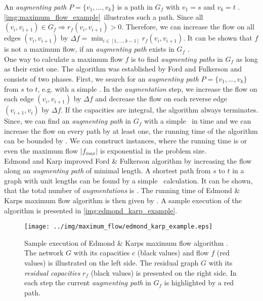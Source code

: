 An \emph{augmenting path} $P = \{v_1,\ldots,v_k\}$ is a path in $G_f$ with $v_1 = s$ and 
$v_k = t$ \cite{edmonds1972theoretical}. \autoref{img:maximum_flow_example}~illustrates such a path.
Since all $(v_i,v_{i+1}) \in G_f \Rightarrow r_f(v_i,v_{i+1}) > 0$. 
Therefore, we can increase the flow on all edges $(v_i,v_{i+1})$ by 
$\Delta f = \min_{i \in [1,\ldots,k-1]} r_f(v_i,v_{i+1})$. It can be shown that $f$ is not a
maximum flow, if an \emph{augmenting path} exists in $G_f$ \cite{edmonds1972theoretical}. \\
One way to calculate a maximum flow $f$ is to find \emph{augmenting paths} in $G_f$ as
long as their exist one. The algorithm was established by Ford and Fulkerson \cite{ford1956maximal} and
consists of two phases. First, we search for an \emph{augmenting path} $P = \{v_1,\ldots,v_k\}$
from $s$ to $t$, e.g. with a simple \DFS. In the \emph{augmentation} step, we increase the flow on each
edge $(v_i,v_{i+1})$ by $\Delta f$ and decrease the flow on each reverse edge $(v_{i+1},v_i)$
by $\Delta f$. If the capacities are integral, the algorithm always terminates. Since, we can find an \emph{augmenting
path} in $G_f$ with a simple \DFS~in time  and we can increase the
flow on every path by at least one, the running time of the algorithm can be bounded by .
We can construct instances, where the running time is  or even the maximum flow $|f_{max}|$ 
is exponential in the problem size. \\
Edmond and Karp \cite{edmonds1972theoretical} improved Ford \& Fulkerson algorithm by increasing the flow
along an \emph{augmenting path} of minimal length. A shortest path from $s$ to $t$ in a 
graph with unit lengths can be found by a simple \BFS~calculation. It can be shown, that the
total number of \emph{augmentations} is . The running time of Edmond \& Karps
maximum flow algorithm is then given by . A sample execution of the algorithm
is presented in \autoref{img:edmond_karp_example}.

\begin{figure}
\centering
\texttt{[image: ../img/maximum\_flow/edmond\_karp\_example.eps]}
\caption{Sample execution of Edmond \& Karps maximum flow algorithm \cite{edmonds1972theoretical}.
         The network $G$ with its capacities $c$ (black values) and flow $f$ (red values) is illustrated
         on the left side. The residual graph $G$ with its \emph{residual capacities} $r_f$ (black values)
         is presented on the right side. In each step the current \emph{augmenting path} in $G_f$ is highlighted
         by a red path. }
\label{img:edmond_karp_example}
\end{figure}

